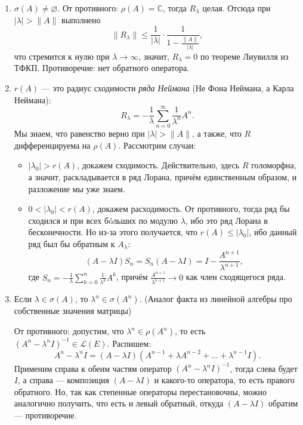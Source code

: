 \documentclass[12pt, a4paper]{article}
\renewcommand{\le}{\leqslant}  %
\begin{document}
\begin{enumerate}
    \item $\sigma(A) \ne \varnothing$.
        От противного: $\rho(A) = \mathbb C$, тогда $R_\lambda$ целая.
        Отсюда при $|\lambda| > \|A\|$ выполнено
        \[
            \|R_\lambda\| \le \frac{1}{|\lambda|} \cdot \frac{1}{1 - \frac{\|A\|}{|\lambda|}},
        \]
        что стремится к нулю при $\lambda \to \infty$, значит, $R_\lambda = 0$ по теореме Лиувилля из ТФКП.
        Противоречие: нет обратного оператора.
        
    \item $r(A)$ --- это радиус сходимости \textit{ряда Неймана} (Не Фона Неймана, а Карла Неймана):
        \[
            R_{\lambda} = -\frac{1}{\lambda} \sum_{n=0}^\infty \frac{1}{\lambda^n} A^n.
        \]
        Мы знаем, что равенство верно при $|\lambda| > \|A\|$, а также, что $R$ дифференцируема на $\rho(A)$.
        Рассмотрим случаи:
        \begin{itemize}
            \item $|\lambda_0| > r(A)$, докажем сходимость.
                Действительно, здесь $R$ голоморфна, а значит, раскладывается в ряд Лорана, причём единственным образом, и разложение мы уже знаем.

            \item $0 < |\lambda_0| < r(A)$, докажем расходимость.
                От противного, тогда ряд бы сходился и при всех бóльших по модулю $\lambda$, ибо это ряд Лорана в бесконечности.
                Но из-за этого получается, что $r(A) \le |\lambda_0|$, ибо данный ряд был бы обратным к $A_\lambda$:
                \[
                    (A - \lambda I) S_n = S_n (A - \lambda I) = I - \frac{A^{n+1}}{\lambda^{n+1}},
                \]
                где $S_n = -\frac{1}{\lambda} \sum_{k=0}^n \frac{1}{\lambda^k} A^k$, причём $\frac{A^{n+1}}{\lambda^{n+1}} \to 0$ как член сходящегося ряда.
        \end{itemize}

    \item Если $\lambda \in \sigma(A)$, то $\lambda^n \in \sigma(A^n)$.
        (Аналог факта из линейной алгебры про собственные значения матрицы)

        От противного: допустим, что $\lambda^n \in \rho(A^n)$, то есть $(A^n - \lambda^n I)^{-1} \in \mathcal L(E)$.
        Распишем:
        \[
            A^n - \lambda^n I = (A - \lambda I)(A^{n-1} + \lambda A^{n-2} + \dots + \lambda^{n-1} I).
        \]
        Применим справа к обеим частям оператор $(A^n - \lambda^n I)^{-1}$, тогда слева будет $I$, а справа --- композиция $(A - \lambda I)$ и какого-то оператора, то есть правого обратного.
        Но, так как степенные операторы перестановочны, можно аналогично получить, что есть и левый обратный, откуда $(A - \lambda I)$ обратим --- противоречие.


\end{enumerate}
\end{document}
